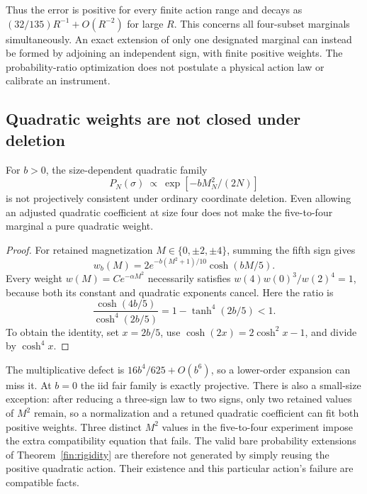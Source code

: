 Thus the error is positive for every finite action range and decays
as \((32/135)R^{-1}+O(R^{-2})\) for large \(R\).
This concerns all four-subset marginals simultaneously.  An exact
extension of only one designated marginal can instead be formed by
adjoining an independent sign, with finite positive weights.
The probability-ratio optimization does not postulate a physical
action law or calibrate an instrument.

\subsection{Quadratic weights are not closed under deletion}
\label{fin:quadratic}

\begin{proposition}
\label{fin:quadratic-closure}
For \(b>0\), the size-dependent quadratic family
\[
 P_N(\sigma)\ \propto\ \exp[-b M_N^2/(2N)]
\]
is not projectively consistent under ordinary coordinate deletion.
Even allowing an adjusted quadratic coefficient at size four does not
make the five-to-four marginal a pure quadratic weight.
\end{proposition}
\begin{proof}
For retained magnetization \(M\in\{0,\pm2,\pm4\}\), summing the fifth
sign gives
\[
 w_b(M)=2e^{-b(M^2+1)/10}\cosh(bM/5).
\]
Every weight \(w(M)=C e^{-\alpha M^2}\) necessarily satisfies
\(w(4)w(0)^3/w(2)^4=1\), because both its constant and quadratic
exponents cancel.  Here the ratio is
\[
 \frac{\cosh(4b/5)}{\cosh^4(2b/5)}
 =1-\tanh^4(2b/5)<1.
\]
To obtain the identity, set \(x=2b/5\), use
\(\cosh(2x)=2\cosh^2x-1\), and divide by \(\cosh^4x\).
\end{proof}

The multiplicative defect is \(16b^4/625+O(b^6)\), so a lower-order
expansion can miss it.  At \(b=0\) the iid fair family is exactly
projective.  There is also a small-size exception: after reducing a
three-sign law to two signs, only two retained values of \(M^2\) remain, so a
normalization and a retuned quadratic coefficient can fit both
positive weights.  Three distinct \(M^2\) values in the five-to-four
experiment impose the extra compatibility equation that fails.
The valid bare probability extensions of Theorem~\ref{fin:rigidity}
are therefore not generated by simply reusing the positive quadratic
action.  Their existence and this particular action's failure are
compatible facts.
